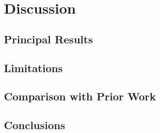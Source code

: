 \section{Discussion}

\subsection{Principal Results}

\subsection{Limitations}

\subsection{Comparison with Prior Work}

\subsection{Conclusions}